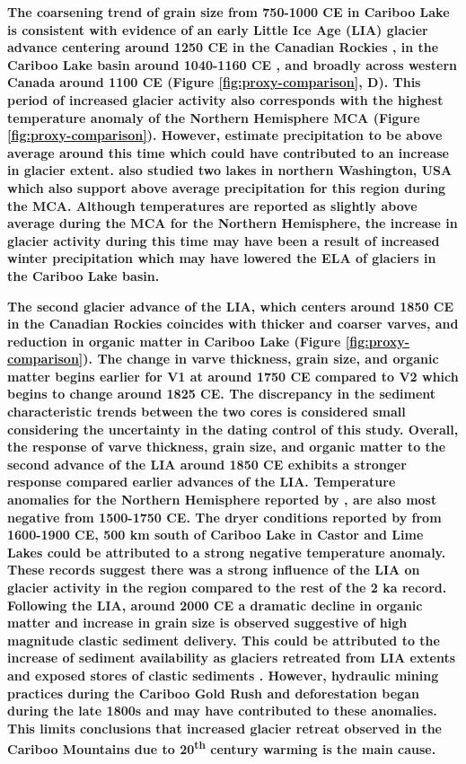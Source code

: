 \documentclass[Royal,times,doublespace,sageh]{sagej}
\begin{document}
\textbf{The coarsening trend of grain size from 750-1000 CE in Cariboo
Lake is consistent with evidence of an early Little Ice Age (LIA)
glacier advance centering around 1250 CE in the Canadian Rockies
\citep{Luckman1995, Osborn2001, Leonard1997}, in the Cariboo Lake basin
around 1040-1160 CE \citep{Maurer2012b}, and broadly across western
Canada around 1100 CE \citep{Solomina2016} (Figure
\ref{fig:proxy-comparison}, D). This period of increased glacier
activity also corresponds with the highest temperature anomaly of the
Northern Hemisphere MCA \citep{Moberg2005} (Figure
\ref{fig:proxy-comparison}). However, \citet{Ljungqvist2016} estimate
precipitation to be above average around this time which could have
contributed to an increase in glacier extent. \citet{Steinman2012} also
studied two lakes in northern Washington, USA which also support above
average precipitation for this region during the MCA. Although
temperatures are reported as slightly above average during the MCA
\citep{Moberg2005} for the Northern Hemisphere, the increase in glacier
activity during this time may have been a result of increased winter
precipitation which may have lowered the ELA of glaciers in the Cariboo
Lake basin.}

\textbf{The second glacier advance of the LIA, which centers around 1850
CE in the Canadian Rockies \citep{Luckman2000e, Leonard1997} coincides
with thicker and coarser varves, and reduction in organic matter in
Cariboo Lake (Figure \ref{fig:proxy-comparison}). The change in varve
thickness, grain size, and organic matter begins earlier for V1 at
around 1750 CE compared to V2 which begins to change around 1825 CE. The
discrepancy in the sediment characteristic trends between the two cores
is considered small considering the uncertainty in the dating control of
this study. Overall, the response of varve thickness, grain size, and
organic matter to the second advance of the LIA around 1850 CE exhibits
a stronger response compared earlier advances of the LIA. Temperature
anomalies for the Northern Hemisphere reported by \citet{Moberg2005},
are also most negative from 1500-1750 CE. The dryer conditions reported
by \citet{Steinman2012} from 1600-1900 CE, 500 km south of Cariboo Lake
in Castor and Lime Lakes could be attributed to a strong negative
temperature anomaly. These records suggest there was a strong influence
of the LIA on glacier activity in the region compared to the rest of the
2 ka record. Following the LIA, around 2000 CE a dramatic decline in
organic matter and increase in grain size is observed suggestive of high
magnitude clastic sediment delivery. This could be attributed to the
increase of sediment availability as glaciers retreated from LIA extents
and exposed stores of clastic sediments \citep{Beedle2015}. However,
hydraulic mining practices during the Cariboo Gold Rush and
deforestation began during the late 1800s and may have contributed to
these anomalies. This limits conclusions that increased glacier retreat
observed in the Cariboo Mountains due to 20\textsuperscript{th} century
warming \citep{Beedle2015} is the main cause.}
\end{document}
